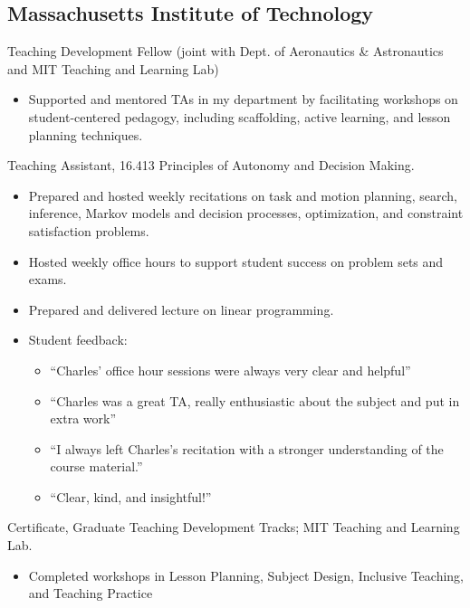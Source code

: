 \documentclass{cv_style}
\begin{document}
\subsection{Massachusetts Institute of Technology}
\begin{description}[leftmargin=\parindent,labelindent=\parindent]
    \item[AY 2022-23] Teaching Development Fellow (joint with Dept. of Aeronautics \& Astronautics and MIT Teaching and Learning Lab)
        \begin{itemize}
            \item Supported and mentored TAs in my department by facilitating workshops on student-centered pedagogy, including scaffolding, active learning, and lesson planning techniques.
        \end{itemize}
    \item[Fall 2020] Teaching Assistant, 16.413 Principles of Autonomy and Decision Making.
        \begin{itemize}
            \item Prepared and hosted weekly recitations on task and motion planning, search, inference, Markov models and decision processes, optimization, and constraint satisfaction problems.
            \item Hosted weekly office hours to support student success on problem sets and exams.
            \item Prepared and delivered lecture on linear programming.
            \item Student feedback:
                \begin{itemize}
                    \item ``Charles' office hour sessions were always very clear and helpful''
                    \item ``Charles was a great TA, really enthusiastic about the subject and put in extra work''
                    \item ``I always left Charles's recitation with a stronger understanding of the course material.''
                    \item ``Clear, kind, and insightful!''
                \end{itemize}
        \end{itemize}
    \item[Spring 2021] Certificate, Graduate Teaching Development Tracks; MIT Teaching and Learning Lab.
        \begin{itemize}
            \item Completed workshops in Lesson Planning, Subject Design, Inclusive Teaching, and Teaching Practice
        \end{itemize}
\end{description}
\end{document}

